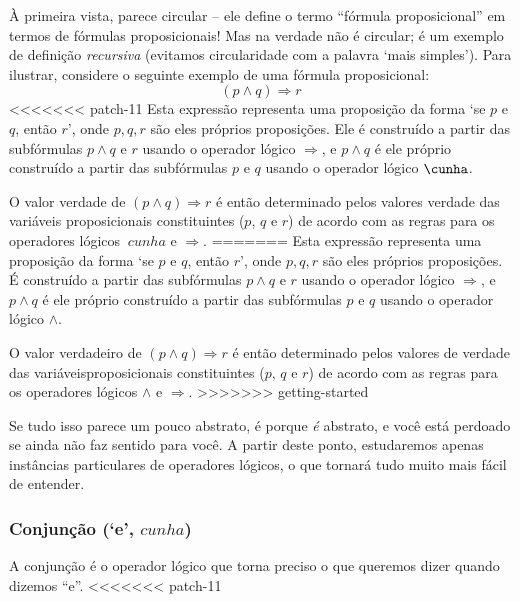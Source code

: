 À primeira vista,  parece circular – ele define o termo “fórmula proposicional” em termos de fórmulas proposicionais! Mas na verdade não é circular; é um exemplo de definição \textit{recursiva} (evitamos circularidade com a palavra `mais simples'). Para ilustrar, considere o seguinte exemplo de uma fórmula proposicional:
\[
(p \wedge q) \Rightarrow r
\]
<<<<<<< patch-11
Esta expressão representa uma proposição da forma `se $p$ e $q$, então $r$', onde $p,q,r$ são eles próprios proposições. Ele é construído a partir das subfórmulas $p \wedge q$ e $r$ usando o operador lógico $\Rightarrow$, e $p \wedge q$ é ele próprio construído a partir das subfórmulas $p$ e $q$ usando o operador lógico $\cunha$.

O valor verdade de $(p \wedge q) \Rightarrow r$ é então determinado pelos valores verdade das variáveis ​​proposicionais constituintes ($p$, $q$ e $r$) de acordo com as regras para os operadores lógicos $\ cunha$ e $\Rightarrow$.
=======
Esta expressão representa uma proposição da forma `se $p$ e $q$, então $r$', onde $p,q,r$ são eles próprios proposições. É construído a partir das subfórmulas $p \wedge q$ e $r$ usando o operador lógico $\Rightarrow$, e $p \wedge q$ é ele próprio construído a partir das subfórmulas $p$ e $q$ usando o operador lógico $\wedge$.

O valor verdadeiro de $(p \wedge q) \Rightarrow r$ é então determinado pelos valores de verdade das variáveis ​​proposicionais constituintes ($p$, $q$ e $r$) de acordo com as regras para os operadores lógicos $\wedge$ e $\Rightarrow$.
>>>>>>> getting-started

Se tudo isso parece um pouco abstrato, é porque \textit{é} abstrato, e você está perdoado se ainda não faz sentido para você. A partir deste ponto, estudaremos apenas instâncias particulares de operadores lógicos, o que tornará tudo muito mais fácil de entender.

\subsubsection*{Conjunção (`e', $cunha$)}

A conjunção é o operador lógico que torna preciso o que queremos dizer quando dizemos “e”.
<<<<<<< patch-11

